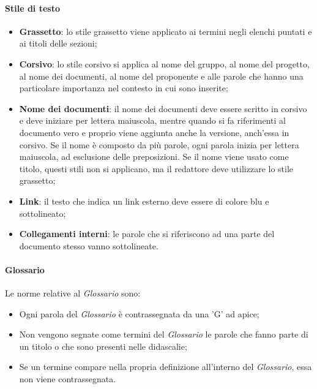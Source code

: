 \paragraph{Stile di testo}
\begin{itemize}

	\item \textbf{Grassetto}: lo stile grassetto viene applicato ai termini negli elenchi puntati e ai titoli delle sezioni;
	
	\item \textbf{Corsivo}: lo stile corsivo si applica al nome del gruppo, al nome del progetto, al nome dei documenti, al nome del proponente e alle parole che hanno una particolare importanza nel contesto in cui sono inserite;
	
	\item \textbf{Nome dei documenti}: il nome dei documenti deve essere scritto in corsivo e deve iniziare per lettera maiuscola, mentre quando si fa riferimenti al documento vero e proprio viene aggiunta anche la versione, anch'essa in corsivo. Se il nome è composto da più parole, ogni parola inizia per lettera maiuscola, ad esclusione delle preposizioni.  Se il nome viene usato come titolo, questi stili non si applicano, ma il redattore deve utilizzare lo stile grassetto;
	
	\item \textbf{Link}: il testo che indica un link esterno deve essere di colore blu e sottolineato;
	
	\item \textbf{Collegamenti interni}: le parole che si riferiscono ad una parte del documento stesso vanno sottolineate.

\end{itemize}

\paragraph{Glossario}
Le norme relative al \textit{Glossario} sono:
\begin{itemize}

	\item Ogni parola del \textit{Glossario} è contrassegnata da una 'G' ad apice;
	
	\item Non vengono segnate come termini del \textit{Glossario} le parole che fanno parte di un titolo o che sono presenti nelle didascalie;
	
	\item Se un termine compare nella propria definizione all'interno del \textit{Glossario}, essa non viene contrassegnata.

\end{itemize}

